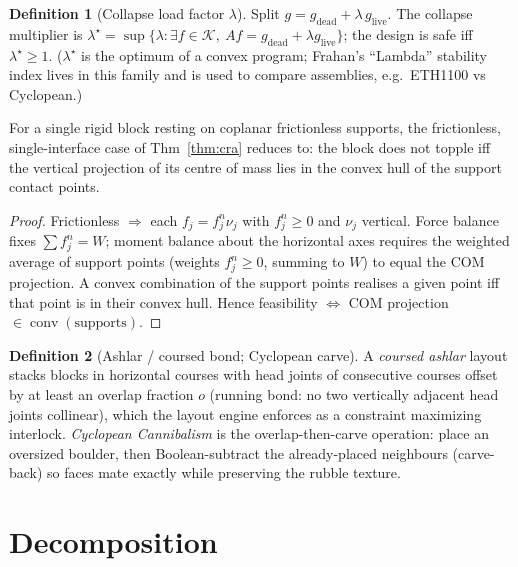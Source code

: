 \documentclass[11pt]{article}
\theoremstyle{definition}\newtheorem{definition}{Definition}[section]
\theoremstyle{plain}\newtheorem{theorem}{Theorem}[section]
\DeclareMathOperator{\conv}{conv}\DeclareMathOperator*{\argmin}{arg\,min}
\begin{document}
\begin{definition}[Collapse load factor $\lambda$]
Split $g=g_{\mathrm{dead}}+\lambda\,g_{\mathrm{live}}$. The collapse multiplier is
$\lambda^\star=\sup\{\lambda: \exists f\in\mathcal K,\ Af=g_{\mathrm{dead}}+\lambda g_{\mathrm{live}}\}$; the
design is safe iff $\lambda^\star\ge1$. ($\lambda^\star$ is the optimum of a convex program; Frahan's
``Lambda'' stability index lives in this family and is used to compare assemblies, e.g.\ ETH1100 vs
Cyclopean.)
\end{definition}
\begin{proposition}
For a single rigid block resting on coplanar frictionless supports, the frictionless, single-interface case
of Thm~\ref{thm:cra} reduces to: the block does not topple iff the vertical projection of its centre of mass
lies in the convex hull of the support contact points.
\end{proposition}
\begin{proof}
Frictionless $\Rightarrow$ each $f_j=f_j^n\nu_j$ with $f_j^n\ge0$ and $\nu_j$ vertical. Force balance fixes
$\sum f_j^n=W$; moment balance about the horizontal axes requires the weighted average of support points
(weights $f_j^n\ge0$, summing to $W$) to equal the COM projection. A convex combination of the support points
realises a given point iff that point is in their convex hull. Hence feasibility $\Leftrightarrow$ COM
projection $\in\conv(\text{supports})$.
\end{proof}
\begin{definition}[Ashlar / coursed bond; Cyclopean carve]
A \emph{coursed ashlar} layout stacks blocks in horizontal courses with head joints of consecutive courses
offset by at least an overlap fraction $o$ (running bond: no two vertically adjacent head joints collinear),
which the layout engine enforces as a constraint maximizing interlock. \emph{Cyclopean Cannibalism} is the
overlap-then-carve operation: place an oversized boulder, then Boolean-subtract the already-placed neighbours
(carve-back) so faces mate exactly while preserving the rubble texture.
\end{definition}

\section{Decomposition}
\end{document}
